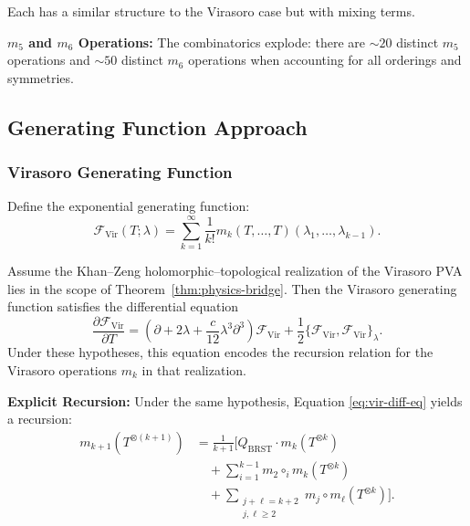 Each has a similar structure to the Virasoro case but with mixing terms.

\textbf{$m_5$ and $m_6$ Operations:}
The combinatorics explode: there are $\sim 20$ distinct $m_5$ operations and $\sim 50$ distinct $m_6$ operations when accounting for all orderings and symmetries.

\subsection{Generating Function Approach}

\subsubsection{Virasoro Generating Function}

Define the exponential generating function:
\begin{equation}
\mathcal{F}_{\text{Vir}}(T; \lambda) = \sum_{k=1}^\infty \frac{1}{k!} m_k(T, \ldots, T)(\lambda_1, \ldots, \lambda_{k-1}).
\end{equation}

\begin{theorem}
Assume the Khan--Zeng holomorphic--topological realization of the
Virasoro PVA lies in the scope of
Theorem~\ref{thm:physics-bridge}. Then the Virasoro generating
function satisfies the differential equation
\begin{equation}
\frac{\partial \mathcal{F}_{\text{Vir}}}{\partial T} = \left( \partial + 2\lambda + \frac{c}{12}\lambda^3 \partial^3 \right) \mathcal{F}_{\text{Vir}} + \frac{1}{2} \{\mathcal{F}_{\text{Vir}}, \mathcal{F}_{\text{Vir}}\}_\lambda.
\end{equation}
Under these hypotheses, this equation encodes the recursion relation for the
Virasoro operations $m_k$ in that realization.
\end{theorem}

\textbf{Explicit Recursion:}
Under the same hypothesis, Equation \eqref{eq:vir-diff-eq} yields a
recursion:
\begin{align}
m_{k+1}(T^{\otimes (k+1)}) &= \frac{1}{k+1} \Bigg[ Q_{\text{BRST}} \cdot m_k(T^{\otimes k})\\
&\quad + \sum_{i=1}^{k-1} m_2 \circ_i m_k(T^{\otimes k})\\
&\quad + \sum_{\substack{j+\ell = k+2 \\ j,\ell \geq 2}} m_j \circ m_\ell(T^{\otimes k}) \Bigg].
\end{align}

